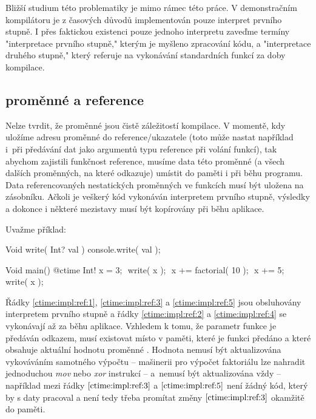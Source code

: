 Bližší studium této problematiky je mimo rámec této práce. V demonstračním kompilátoru je z časových důvodů implementován pouze interpret prvního stupně. I přes faktickou existenci pouze jednoho interpretu zaveďme termíny "interpretace prvního stupně," kterým je myšleno zpracování \ctime kódu, a "interpretace druhého stupně," který referuje na vykonávání standardních funkcí za doby kompilace.

\subsection{\ctime proměnné a \nonctime reference}
Nelze tvrdit, že \ctime proměnné jsou čistě záležitostí kompilace. V momentě, kdy uložíme adresu \ctime proměnné do \nonctime reference/ukazatele (toto může nastat například i~při předávání \ctime dat jako argumentů typu reference při volání \nonctime funkcí), tak abychom zajistili funkčnost reference, musíme data této proměnné (a všech dalších proměnných, na které odkazuje) umístit do paměti i při běhu programu. Data referencovaných nestatických \ctime proměnných ve funkcích musí být uložena na zásobníku. Ačkoli je veškerý \ctime kód vykonáván interpretem prvního stupně, výsledky a dokonce i některé mezistavy musí být kopírovány při běhu aplikace.

Uvažme příklad:

\begin{code}
Void write( Int? val ) {
	console.write( val );
}
	
Void main() {
	@ctime Int! x = 3; $\label{ctime:impl:ref:1}$
	write( x ); $\label{ctime:impl:ref:2}$
	x += factorial( 10 ); $\label{ctime:impl:ref:3}$
	x += 5; $\label{ctime:impl:ref:5}$
	write( x ); $\label{ctime:impl:ref:4}$
}
\end{code}

Řádky \ref{ctime:impl:ref:1}, \ref{ctime:impl:ref:3} a \ref{ctime:impl:ref:5} jsou obsluhovány interpretem prvního stupně a řádky \ref{ctime:impl:ref:2} a \ref{ctime:impl:ref:4} se vykonávají až za běhu aplikace. Vzhledem k tomu, že parametr funkce  je předáván odkazem, musí existovat místo v paměti, které je funkci předáno a které obsahuje aktuální hodnotu proměnné . Hodnota nemusí být aktualizována vykováváním samotného výpočtu -- mašinerii pro výpočet faktoriálu lze nahradit jednoduchou \textit{mov} nebo \textit{xor} instrukcí -- a~nemusí být aktualizována vždy -- například mezi řádky $\ref{ctime:impl:ref:3}$ a $\ref{ctime:impl:ref:5}$ není žádný \nonctime kód, který by s daty pracoval a není tedy třeba promítat změny $\ref{ctime:impl:ref:3}$ okamžitě do paměti. 

